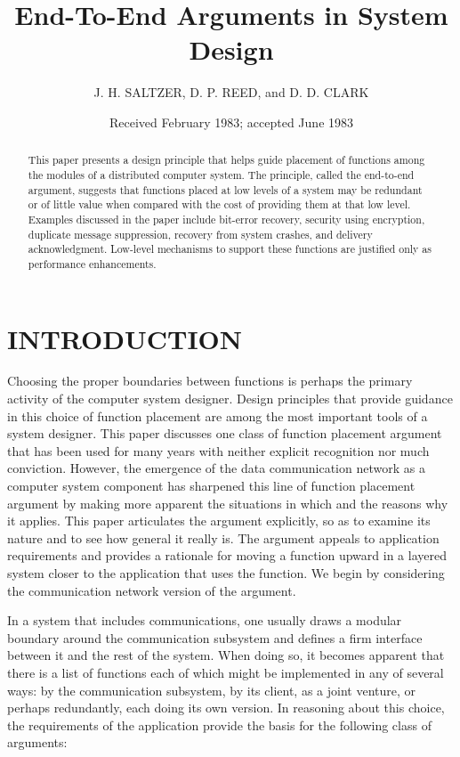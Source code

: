 \documentclass[a4paper,12pt,notitlepage,twoside,openright]{article}
\title{End-To-End Arguments in System Design}
\author{J. H. SALTZER, D. P. REED, and D. D. CLARK}
\date{Received February 1983; accepted June 1983}
\begin{document}
\maketitle

\begin{abstract}
This paper presents a design principle that helps guide placement of
functions among the modules of a distributed computer system. The
principle, called the end-to-end argument, suggests that functions
placed at low levels of a system may be redundant or of little value
when compared with the cost of providing them at that low level.
Examples discussed in the paper include bit-error recovery, security
using encryption, duplicate message suppression, recovery from system
crashes, and delivery acknowledgment. Low-level mechanisms to support
these functions are justified only as performance enhancements.
\end{abstract}

\hypertarget{introduction}{%
  \section{INTRODUCTION}\label{introduction}}

Choosing the proper boundaries between functions is perhaps the primary
activity of the computer system designer. Design principles that provide
guidance in this choice of function placement are among the most
important tools of a system designer. This paper discusses one class of
function placement argument that has been used for many years with
neither explicit recognition nor much conviction. However, the
emergence of the data communication network as a computer system
component has sharpened this line of function placement argument by
making more apparent the situations in which and the reasons why it
applies. This paper articulates the argument explicitly, so as to
examine its nature and to see how general it really is. The argument
appeals to application requirements and provides a rationale for moving
a function upward in a layered system closer to the application that
uses the function. We begin by considering the communication network
version of the argument.

In a system that includes communications, one usually draws a modular
boundary around the communication subsystem and defines a firm interface
between it and the rest of the system. When doing so, it becomes
apparent that there is a list of functions each of which might be
implemented in any of several ways: by the communication subsystem, by
its client, as a joint venture, or perhaps redundantly, each doing its
own version. In reasoning about this choice, the requirements of the
application provide the basis for the following class of arguments:
\end{document}
